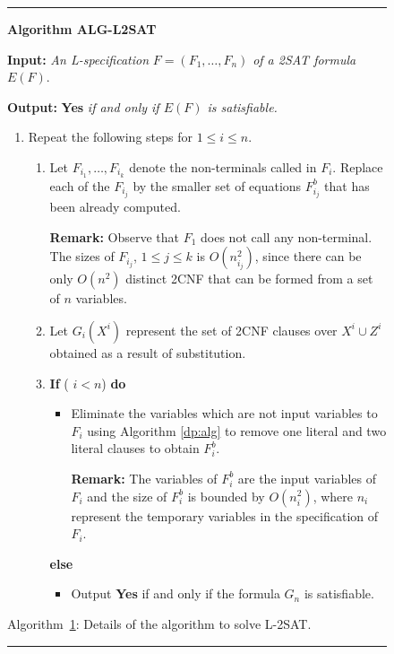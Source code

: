 {\small
\begin{figure}[tbp]
\rule{10cm}{0.01in}

\noindent
{\bf Algorithm ALG-L2SAT} 

\noindent
{\bf Input:} {\it An L-specification} $F = (F_1, \ldots , F_n)$
{\it of a 2SAT formula } $E(F)$.  

\noindent
{\bf Output:} {\bf Yes} {\it if and only if $E(F)$ is satisfiable.} 

\begin{enumerate}

\item
Repeat the following steps for $1 \leq i \leq n$.

\begin{enumerate}


\item
Let $F_{i_1}, \ldots, F_{i_k}$ denote the non-terminals called in $F_i$.
Replace each of the $F_{i_j}$ by the smaller set of equations $F^b_{i_j}$
that has been already computed.

\noindent
{\bf Remark:} Observe that $F_1$ does not call any non-terminal. 
The sizes of $F_{i_j}$, $ 1 \leq j \leq k$ is $O(n_{i_j}^2)$, since
there can be only $O(n^2)$ distinct {\sf 2CNF}  that can be formed
from a set of $n$ variables. 


\item 
Let $G_i(X^i)$ represent the set of 2CNF clauses   over $X^i \cup Z^i$
obtained as a result of substitution.


\item
{\bf If} ( $ i < n  $) {\bf do}
\begin{itemize}
\item
Eliminate the variables which are not input variables to $F_i$ 
using  Algorithm \ref{dp:alg} to
remove one literal and two literal clauses to obtain $F^b_i$.

\noindent
{\bf Remark:} The variables of $F^b_i$ are the input variables of $F_i$
and the size of $F^b_i$ is bounded by $O(n_i^2)$, where $n_i$ represent
the temporary variables in the specification of $F_i$.

\end{itemize}
{\bf else}
\begin{itemize}
\item
Output {\bf Yes} if and only if the formula $G_n$ is satisfiable.
\end{itemize}

\end{enumerate}

\end{enumerate}
\label{l2sat:alg}
\begin{center}
Algorithm~\ref{l2sat:alg}: Details of the algorithm to solve {\sf L-2SAT}.
\end{center}
\vspace*{-.2in}
\rule{10cm}{0.01in}
\end{figure}
}
\newspacing



